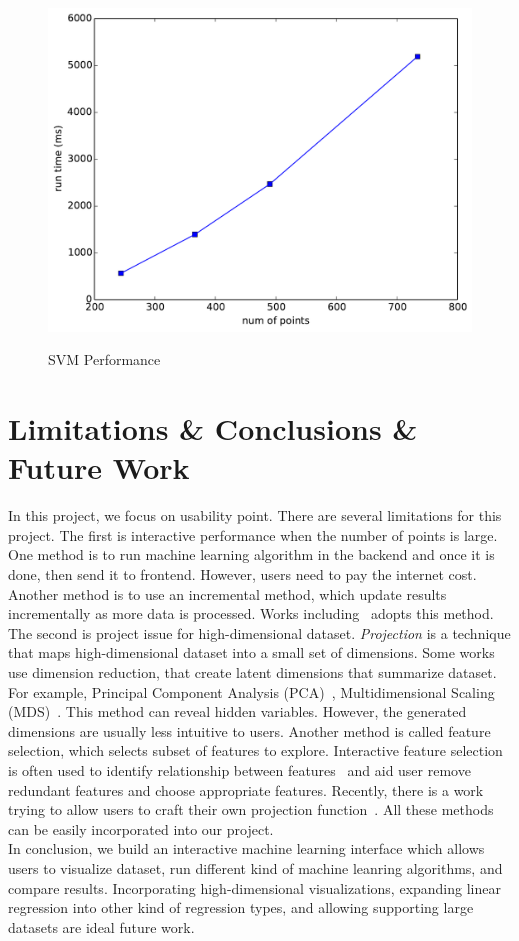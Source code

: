 \documentclass{article}
\begin{document}
\begin{figure}[h]
	\includegraphics[width=\textwidth]{figs/svm_result}
	\label{fig:svm_result}
	\caption{SVM Performance}
\end{figure} 

\section{Limitations \& Conclusions \& Future Work}
In this project, we focus on usability point. There are several limitations for this project. The first is interactive performance when the number of points is large. One method is to run machine learning algorithm in the backend and once it is done, then send it to frontend.  However, users need to pay the internet cost.  Another method is to use an incremental method, which update results incrementally as more data is processed. Works including~\cite{crotty2015vizdom} adopts this method. \\
The second is project issue for high-dimensional dataset. \emph{Projection} is a technique that maps high-dimensional dataset into a small set of dimensions. Some works use dimension reduction, that create latent dimensions that summarize dataset. For example, Principal Component Analysis (PCA)~\cite{jolliffe2002principal}, Multidimensional Scaling (MDS)~\cite{mead1992review}. This method can reveal hidden variables. However, the generated dimensions are usually less intuitive to users. Another method is called feature selection, which selects subset of features to explore. Interactive feature selection is often used to identify relationship between features~\cite{guo2003coordinating, yang2004value} and aid user remove redundant features and choose appropriate features. Recently, there is a work trying to allow users to craft their own projection function~\cite{gleicher2013explainers}.  All these methods can be easily incorporated into our project.  \\
In conclusion, we build an interactive machine learning interface which allows users to visualize dataset, run different kind of machine leanring algorithms, and compare results. Incorporating high-dimensional visualizations, expanding linear regression into other kind of regression types, and allowing supporting large datasets are ideal future work.



\end{document}
